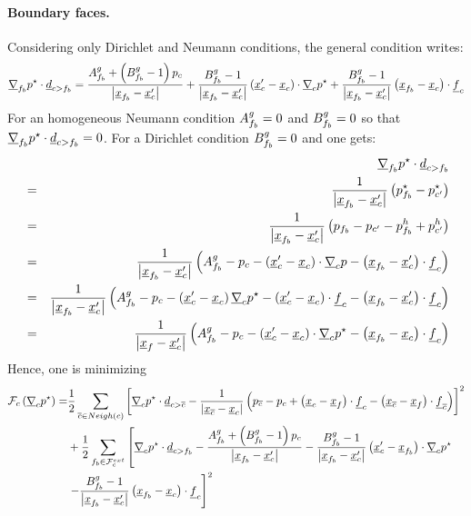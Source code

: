 \paragraph{Boundary faces.} Considering only Dirichlet and Neumann conditions,
the general condition writes:
\begin{equation}
	\grad_{\fib}{p^\star}\cdot\vect{d}_{\ib}=\frac{A^{g}_{\fib} +\left(B^{g}_{\fib}-1\right)p_{\celli}}{\norm{\centfb-\centip}}+\frac{B^{g}_{\fib}-1}{\norm{\centfb-\centip}}\left(\centip-\centi\right)\cdot\grad_{\celli}{p^\star}+\frac{B^{g}_{\fib}-1}{\norm{\centfb-\centip}}\left(\centfb-\centi\right)\cdot\vect{f}_{\celli}
\end{equation}
For an homogeneous Neumann condition $A^{g}_{\fib}=0$ and $B^{g}_{\fib}=0$ so that
$\grad_{\fib}{p^\star}\cdot\vect{d}_{\ib}=0$. For a Dirichlet condition
$B^{g}_{\fib}=0$ and one gets:
\begin{align*}
	&&\grad_{\fib}{p^\star}\cdot\vect{d}_{\ib} \\ &=&\frac{1}{\norm{\centfb-\centip}}\left(p_{\fib}^\star-p_{\cellip}^\star\right) \\
	&=&\frac{1}{\norm{\centfb-\centip}}\left(p_{\fib}-p_{\celli'}-p_{\fib}^{h}+p_{\celli'}^{h}\right) \\
	&=&\frac{1}{\norm{\centfb-\centip}}\left(A^{g}_{\fib}-p_{\celli}-\left(\centip-\centi\right)\cdot\grad_{\celli}{p}-\left(\centfb-\centip\right)\cdot\vect{f}_{\celli}\right) \\
	&=&\frac{1}{\norm{\centfb-\centip}}\left(A^{g}_{\fib}-p_{\celli}-\left(\centip-\centi\right)\grad_{\celli}{p^\star}-\left(\centip-\centi\right)\cdot\vect{f}_{\celli}-\left(\centfb-\centip\right)\cdot\vect{f}_{\celli}\right) \\
	&=&\frac{1}{\norm{\centf-\centip}}\left(A^{g}_{\fib}-p_{\celli}-\left(\centip-\centi\right)\cdot\grad_{\celli}{p^\star}-\left(\centfb-\centi\right)\cdot\vect{f}_{\celli}\right)
\end{align*}
Hence, one is minimizing
\begin{align*}
	\mathcal{F}_{\celli}\left(\grad_{\celli}{p^{\star}}\right)=&\frac{1}{2}\sum_{\cellj \in \Neigh{\celli}}\left[\grad_{\celli}{p^\star}\cdot\vect{d}_{\bij}-\frac{1}{\norm{\centj-\centi}}\left(p_{\cellj}-p_{\celli}+\left(\centi-\centf\right)\cdot\vect{f}_{\celli}-\left(\centj-\centf\right)\cdot\vect{f}_{\cellj}\right)\right]^2 \\ &+\frac{1}{2}\sum_{\fib \in \Faceb{\celli}}\left[\grad_{\celli}{p^\star}\cdot\vect{d}_{\ib}-\frac{A^{g}_{\fib}+\left(B^{g}_{\fib}-1\right)p_{\celli}}{\norm{\centfb-\centip}}-\frac{B^{g}_{\fib}-1}{\norm{\centfb-\centip}}\left(\centip-\centfb\right)\cdot\grad_{\celli}{p^\star}\right. \\ & \left.-\frac{B^{g}_{\fib}-1}{\norm{\centfb-\centip}}\left(\centfb-\centi\right)\cdot\vect{f}_{\celli}\right]^2
\end{align*}
